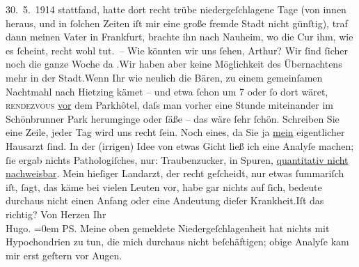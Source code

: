 {\begin{ledgroupsized}[t]{13cm}
{{{                     30. 5. 1914 stattfand}}}\label{K_L02182_2h}, hatte dort recht trübe
               niedergeſchlagene Tage (von innen heraus, und in ſolchen Zeiten iſt mir eine große
               fremde Stadt nicht günſtig), traf dann meinen Vater in Frankfurt,
               brachte ihn nach Nauheim, wo die Cur ihm, wie es
               ſcheint, recht wohl tut. – Wie {\pb}könnten wir uns ſehen, Arthur? Wir ſind ſicher noch die ganze Woche da \label{K_L02182_3v}\label{K_L02182_3h}.\hspace*{1.5em}Wir haben aber keine Möglichkeit des Übernachtens mehr
               in der Stadt.\hspace*{1.5em}Wenn Ihr wie neulich die Bären, zu einem gemeinſamen Nachtmahl nach
                  Hietzing kämet – und etwa ſchon um 7
               oder ſo dort wäret, \textsc{rendezvous}{ }\uline{vor} dem Parkhôtel,
               daſs man {\pb}vorher eine Stunde
               miteinander im Schönbrunner Park herumginge oder
               ſäße – das wäre ſehr ſchön. Schreiben Sie eine Zeile, jeder Tag wird uns recht
               ſein.\pend
           \pstart
           Noch eines, da Sie ja \uline{mein} eigentlicher Hausarzt
               ſind. In der (irrigen) Idee von etwas Gicht ließ ich eine Analyſe machen; ſie ergab
               nichts Pathologiſches, nur: Traubenzucker,  in
               Spuren, {\pb}\uline{quantitativ nicht nachweisbar}. Mein hieſiger Landarzt, der recht geſcheidt,
               nur etwas ſummariſch iſt, ſagt, das käme bei vielen Leuten vor, habe gar nichts auf
               ſich, bedeute durchaus nicht einen Anfang oder eine Andeutung dieſer Krankheit.\hspace*{1.5em}Iſt das richtig?\pend
           \pstart
           Von Herzen Ihr{\\[\baselineskip]}\spacefill\mbox{Hugo.}\pend
           \leftskip=0em{}\pstart
           \noindent{}\textsc{PS}. Meine oben gemeldete Niedergeſchlagenheit hat nichts
                  mit Hypochondrien zu tun, die mich durchaus nicht beſchäftigen; obige Analyſe kam
                  mir erst geſtern vor Augen.\pend
           

\end{ledgroupsized}}
